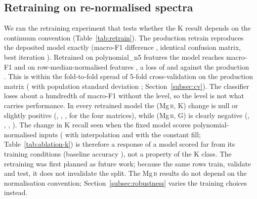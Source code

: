 \documentclass[11pt,a4paper]{article}
\newcommand{\Mgb}{Mg\,\textsc{b}\xspace}
\begin{document}
\subsection{Retraining on re-normalised spectra}
\label{subsec:retrain}

We ran the retraining experiment that tests whether the K result depends on the continuum convention (Table~\ref{tab:retrain}). The production retrain reproduces the deposited model exactly (macro-F1 difference \rtReproDiff, identical confusion matrix, best iteration \rtProdIter). Retrained on polynomial\_n5 features the model reaches macro-F1 \rtPolyMacroF{} and on row-median-normalised features \rtRowMedMacroF, a loss of \rtDeltaMacroPoly{} and \rtDeltaMacroRow{} against the production \rtProdMacroF. This is within the fold-to-fold spread of 5-fold cross-validation on the production matrix (\cvMean{} with population standard deviation \cvSd; Section~\ref{subsec:cv}). The classifier loses about a hundredth of macro-F1 without the level, so the level is not what carries performance. In every retrained model the (\Mgb, K) change is null or slightly positive (\rtProdMgKDelta, \rtPolyMgKDelta, \rtPolyGapMgKDelta, \rtRowMedMgKDelta{} for the four matrices), while (\Mgb, G) is clearly negative (\rtProdMgGDelta, \rtPolyMgGDelta, \rtPolyGapMgGDelta, \rtRowMedMgGDelta). The change in K recall seen when the fixed model scores polynomial-normalised inputs (\ablPolyMgKDelta{} with interpolation and \ablPolyConstMgKDelta{} with the constant fill; Table~\ref{tab:ablation-k}) is therefore a response of a model scored far from its training conditions (baseline accuracy \ablBaseAccPoly), not a property of the K class. The retraining was first planned as future work; because the same rows train, validate and test, it does not invalidate the split. The \Mgb results do not depend on the normalisation convention; Section~\ref{subsec:robustness} varies the training choices instead.
\end{document}
